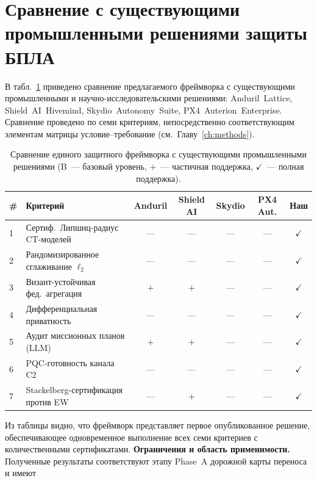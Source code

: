\section{Сравнение с существующими промышленными решениями защиты БПЛА}
\label{sec:uav_comparison}
В табл.~\ref{tab:uav_industry_cmp} приведено сравнение предлагаемого
фреймворка с существующими промышленными и научно-исследовательскими
решениями: \mbox{Anduril~Lattice}, \mbox{Shield~AI~Hivemind},
\mbox{Skydio~Autonomy~Suite}, \mbox{PX4~Auterion~Enterprise}. Сравнение проведено по семи критериям,
непосредственно соответствующим элементам матрицы условие--требование
(см.~Главу~\ref{ch:methods}).
\begin{table}[H]
\centering
\caption{Сравнение единого защитного фреймворка с существующими
промышленными решениями (B~--- базовый уровень, $+$~--- частичная
поддержка, $\checkmark$~--- полная поддержка).}
\label{tab:uav_industry_cmp}
\small
\setlength{\tabcolsep}{3pt}
\renewcommand{\arraystretch}{1.15}
\begin{tabularx}{\linewidth}{@{}lXccccc@{}}
\toprule
\# & \textbf{Критерий}
   & \textbf{Anduril} & \textbf{Shield AI} & \textbf{Skydio} & \textbf{PX4 Aut.} & \textbf{Наш}\\
\midrule
1 & Сертиф.\ Липшиц-радиус CT-моделей           & ---   & ---   & ---   & ---   & $\checkmark$\\
2 & Рандомизированное сглаживание $\ell_2$       & ---   & ---   & ---   & ---   & $\checkmark$\\
3 & Визант-устойчивая фед.\ агрегация            & $+$   & $+$   & ---   & ---   & $\checkmark$\\
4 & Дифференциальная приватность                 & ---   & ---   & ---   & ---   & $\checkmark$\\
5 & Аудит миссионных планов (LLM)                & $+$   & $+$   & ---   & ---   & $\checkmark$\\
6 & PQC-готовность канала C2                     & ---   & ---   & ---   & ---   & $\checkmark$\\
7 & Stackelberg-сертификация против EW           & ---   & $+$   & ---   & ---   & $\checkmark$\\
\bottomrule
\end{tabularx}
\end{table}
Из таблицы видно, что фреймворк представляет первое опубликованное
решение, обеспечивающее одновременное выполнение всех семи критериев
с количественными сертификатами.
\noindent\textbf{Ограничения и область применимости.} Полученные
результаты соответствуют этапу Phase~A дорожной карты переноса и имеют

